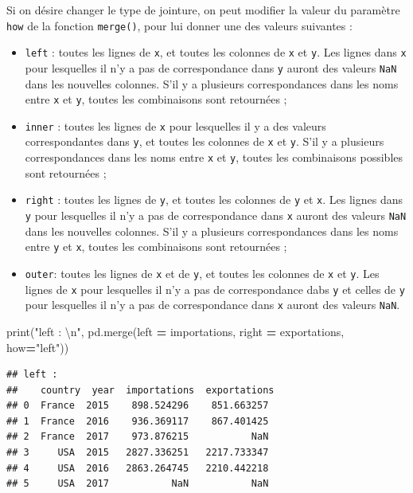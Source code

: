 \documentclass[12pt,]{book}
\newenvironment{Shaded}{\begin{snugshade}}{\end{snugshade}}
\newcommand{\CharTok}[1]{\textcolor[rgb]{0.31,0.60,0.02}{#1}}
\newcommand{\StringTok}[1]{\textcolor[rgb]{0.31,0.60,0.02}{#1}}
\newcommand{\OperatorTok}[1]{\textcolor[rgb]{0.81,0.36,0.00}{\textbf{#1}}}
\newcommand{\BuiltInTok}[1]{#1}
\newcommand{\NormalTok}[1]{#1}
\providecommand{\tightlist}{%
  \setlength{\itemsep}{0pt}\setlength{\parskip}{0pt}}
\numberwithin{equation}{section}
\numberwithin{countremarque}{section}
\begin{document}
Si on désire changer le type de jointure, on peut modifier la valeur du
paramètre \texttt{how} de la fonction \texttt{merge()}, pour lui donner
une des valeurs suivantes :

\begin{itemize}
\tightlist
\item
  \texttt{left} : toutes les lignes de \texttt{x}, et toutes les
  colonnes de \texttt{x} et \texttt{y}. Les lignes dans \texttt{x} pour
  lesquelles il n'y a pas de correspondance dans \texttt{y} auront des
  valeurs \texttt{NaN} dans les nouvelles colonnes. S'il y a plusieurs
  correspondances dans les noms entre \texttt{x} et \texttt{y}, toutes
  les combinaisons sont retournées ;
\item
  \texttt{inner} : toutes les lignes de \texttt{x} pour lesquelles il y
  a des valeurs correspondantes dans \texttt{y}, et toutes les colonnes
  de \texttt{x} et \texttt{y}. S'il y a plusieurs correspondances dans
  les noms entre \texttt{x} et \texttt{y}, toutes les combinaisons
  possibles sont retournées ;
\item
  \texttt{right} : toutes les lignes de \texttt{y}, et toutes les
  colonnes de \texttt{y} et \texttt{x}. Les lignes dans \texttt{y} pour
  lesquelles il n'y a pas de correspondance dans \texttt{x} auront des
  valeurs \texttt{NaN} dans les nouvelles colonnes. S'il y a plusieurs
  correspondances dans les noms entre \texttt{y} et \texttt{x}, toutes
  les combinaisons sont retournées ;
\item
  \texttt{outer}: toutes les lignes de \texttt{x} et de \texttt{y}, et
  toutes les colonnes de \texttt{x} et \texttt{y}. Les lignes de
  \texttt{x} pour lesquelles il n'y a pas de correspondance dabs
  \texttt{y} et celles de \texttt{y} pour lesquelles il n'y a pas de
  correspondance dans \texttt{x} auront des valeurs \texttt{NaN}.
\end{itemize}

\begin{Shaded}
\begin{Highlighting}[]
\BuiltInTok{print}\NormalTok{(}\StringTok{"left : }\CharTok{\textbackslash{}n}\StringTok{"}\NormalTok{, pd.merge(left }\OperatorTok{=}\NormalTok{ importations, right }\OperatorTok{=}\NormalTok{ exportations, how}\OperatorTok{=}\StringTok{"left"}\NormalTok{))}
\end{Highlighting}
\end{Shaded}

\begin{lstlisting}
## left : 
##    country  year  importations  exportations
## 0  France  2015    898.524296    851.663257
## 1  France  2016    936.369117    867.401425
## 2  France  2017    973.876215           NaN
## 3     USA  2015   2827.336251   2217.733347
## 4     USA  2016   2863.264745   2210.442218
## 5     USA  2017           NaN           NaN
\end{lstlisting}
\end{document}

